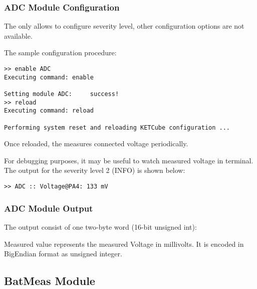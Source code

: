 \subsubsection{ADC Module Configuration}
  The  only allows to configure severity level, other configuration options are not available.
  
  The sample configuration procedure:
  
\begin{docCodeExample}
\begin{verbatim}
>> enable ADC
Executing command: enable

Setting module ADC:     success!
>> reload
Executing command: reload

Performing system reset and reloading KETCube configuration ...
\end{verbatim}
\end{docCodeExample}
  
  Once reloaded, the  measures connected voltage periodically. 
  
  For debugging purposes, it may be useful to watch measured voltage in terminal. The output for the severity level 2 (INFO) is shown below:
  
\begin{docCodeExample}
\begin{verbatim}
>> ADC :: Voltage@PA4: 133 mV
\end{verbatim}
\end{docCodeExample}

\subsubsection{ADC Module Output}
  The  output consist of one two-byte word (16-bit unsigned int):
  

  Measured value represents the measured Voltage in millivolts. It is encoded in BigEndian format as unsigned integer.

\clearpage
\subsection{BatMeas Module}
  
